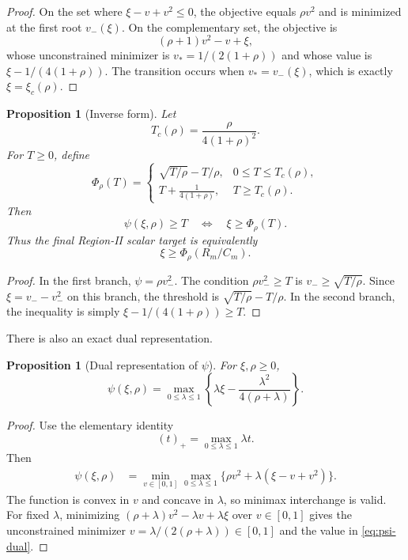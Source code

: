\documentclass[11pt]{article}
\newtheorem{proposition}[theorem]{Proposition}
\begin{document}
\begin{proof}
On the set where $\xi-v+v^2\le0$, the objective equals $\rho v^2$ and is
minimized at the first root $v_-(\xi)$.  On the complementary set, the
objective is
\[
        (\rho+1)v^2-v+\xi,
\]
whose unconstrained minimizer is $v_*=1/(2(1+\rho))$ and whose value is
$\xi-1/(4(1+\rho))$.  The transition occurs when $v_*=v_-(\xi)$, which is
exactly $\xi=\xi_c(\rho)$.
\end{proof}

\begin{proposition}[Inverse form]\label{prop:inverse}
Let
\[
        T_c(\rho)=\frac{\rho}{4(1+\rho)^2}.
\]
For $T\ge0$, define
\[
        \Phi_\rho(T)=
        \begin{cases}
        \sqrt{T/\rho}-T/\rho,
        &0\le T\le T_c(\rho),\\[2mm]
        \displaystyle T+\frac1{4(1+\rho)},
        &T\ge T_c(\rho).
        \end{cases}
\]
Then
\[
        \psi(\xi,\rho)\ge T
        \quad\Longleftrightarrow\quad
        \xi\ge\Phi_\rho(T).
\]
Thus the final Region-II scalar target is equivalently
\begin{equation}\label{eq:inverse-final}
        \xi\ge \Phi_\rho(R_m/C_m).
\end{equation}
\end{proposition}

\begin{proof}
In the first branch, $\psi=\rho v_-^2$.  The condition
$\rho v_-^2\ge T$ is $v_-\ge\sqrt{T/\rho}$.  Since
$\xi=v_--v_-^2$ on this branch, the threshold is
$\sqrt{T/\rho}-T/\rho$.  In the second branch, the inequality is simply
$\xi-1/(4(1+\rho))\ge T$.
\end{proof}

There is also an exact dual representation.

\begin{proposition}[Dual representation of $\psi$]\label{prop:psi-dual}
For $\xi,\rho\ge0$,
\begin{equation}\label{eq:psi-dual}
        \psi(\xi,\rho)=
        \max_{0\le\lambda\le1}
        \left\{
        \lambda\xi-\frac{\lambda^2}{4(\rho+\lambda)}
        \right\}.
\end{equation}
\end{proposition}

\begin{proof}
Use the elementary identity
\[
        (t)_+=\max_{0\le\lambda\le1}\lambda t.
\]
Then
\[
\begin{split}
\psi(\xi,\rho)
&=\min_{v\in[0,1]}\max_{0\le\lambda\le1}
\{\rho v^2+\lambda(\xi-v+v^2)\}.
\end{split}
\]
The function is convex in $v$ and concave in $\lambda$, so minimax
interchange is valid.  For fixed $\lambda$, minimizing
$(\rho+\lambda)v^2-\lambda v+\lambda\xi$ over $v\in[0,1]$ gives the
unconstrained minimizer $v=\lambda/(2(\rho+\lambda))\in[0,1]$ and the value
in \eqref{eq:psi-dual}.
\end{proof}
\end{document}

